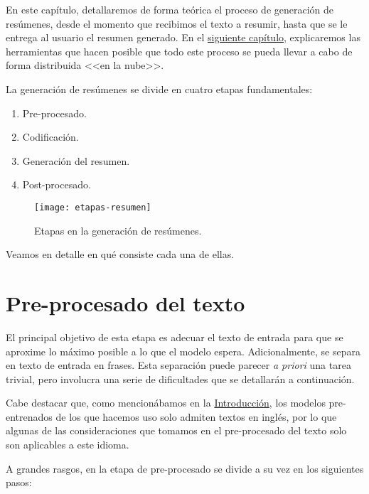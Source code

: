  \label{chapter:conceptos}

En este capítulo, detallaremos de forma teórica el proceso de generación de resúmenes, desde el momento que recibimos el texto a resumir, hasta que se le entrega al usuario el resumen generado. En el \hyperref[chapter:tecnicas]{siguiente capítulo}, explicaremos las herramientas que hacen posible que todo este proceso se pueda llevar a cabo de forma distribuida <<en la nube>>.

La generación de resúmenes se divide en cuatro etapas fundamentales:

\vspace*{-0.25cm}
\begin{enumerate}
	\item  Pre-procesado.
	\item Codificación.
	\item Generación del resumen.
	\item Post-procesado.
\end{enumerate}

\begin{figure}[h]
	\centering
	\texttt{[image: etapas-resumen]}
	\caption{Etapas en la generación de resúmenes.}
	\label{fig:etapas-resumen}
\end{figure}

Veamos en detalle en qué consiste cada una de ellas.

\bigskip
\section{Pre-procesado del texto} \label{sec:preprocesado}

El principal objetivo de esta etapa es adecuar el texto de entrada para que se aproxime lo máximo posible a lo que el modelo espera. Adicionalmente, se separa en texto de entrada en frases. Esta separación puede parecer \emph{a priori} una tarea trivial, pero involucra una serie de dificultades que se detallarán a continuación.

Cabe destacar que, como mencionábamos en la \hyperref[chapter:intro]{Introducción}, los modelos pre-entrenados de los que hacemos uso solo admiten textos en inglés, por lo que algunas de las consideraciones que tomamos en el pre-procesado del texto solo son aplicables a este idioma.

A grandes rasgos, en la etapa de pre-procesado se divide a su vez en los siguientes pasos:

\vspace{-0.4cm}


